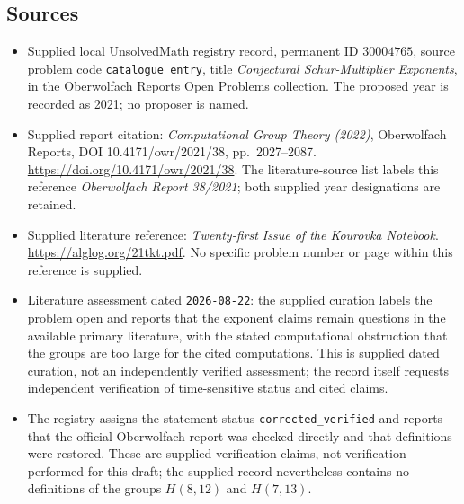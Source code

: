 \documentclass[11pt]{article}
\begin{document}
\subsection{Sources}
\begin{itemize}
\item Supplied local UnsolvedMath registry record, permanent ID \(30004765\), source problem code \texttt{catalogue entry}, title \emph{Conjectural Schur-Multiplier Exponents}, in the Oberwolfach Reports Open Problems collection. The proposed year is recorded as 2021; no proposer is named.
\item Supplied report citation: \emph{Computational Group Theory (2022)}, Oberwolfach Reports, DOI 10.4171/owr/2021/38, pp.\ 2027--2087. \url{https://doi.org/10.4171/owr/2021/38}. The literature-source list labels this reference \emph{Oberwolfach Report 38/2021}; both supplied year designations are retained.
\item Supplied literature reference: \emph{Twenty-first Issue of the Kourovka Notebook}. \url{https://alglog.org/21tkt.pdf}. No specific problem number or page within this reference is supplied.
\item Literature assessment dated \texttt{2026-08-22}: the supplied curation labels the problem open and reports that the exponent claims remain questions in the available primary literature, with the stated computational obstruction that the groups are too large for the cited computations. This is supplied dated curation, not an independently verified assessment; the record itself requests independent verification of time-sensitive status and cited claims.
\item The registry assigns the statement status \texttt{corrected\_verified} and reports that the official Oberwolfach report was checked directly and that definitions were restored. These are supplied verification claims, not verification performed for this draft; the supplied record nevertheless contains no definitions of the groups \(H(8,12)\) and \(H(7,13)\).
\end{itemize}
\end{document}
